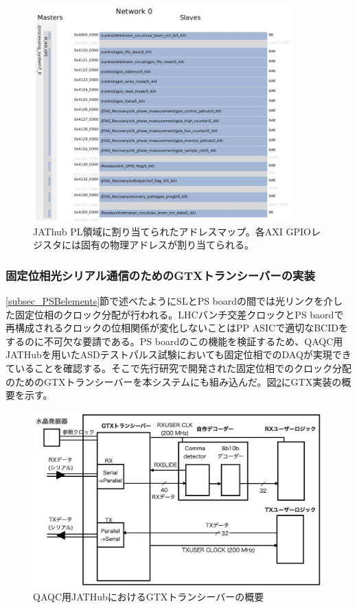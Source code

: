 \begin{figure} 
\centering
\includegraphics[width=10cm]{fig/JATHubaddress.png}
\caption[アドレスマップ]{JAThub PL領域に割り当てられたアドレスマップ。各AXI GPIOレジスタには固有の物理アドレスが割り当てられる。}
\label{JATHuaddress}
\end{figure}

\subsubsection{固定位相光シリアル通信のためのGTXトランシーバーの実装}
\label{subsubsec_gtx}
\ref{subsec_PSBelements}節で述べたようにSLとPS boardの間では光リンクを介した固定位相のクロック分配が行われる。LHCバンチ交差クロックとPS baordで再構成されるクロックの位相関係が変化しないことはPP ASICで適切なBCIDをするのに不可欠な要請である。PS boardのこの機能を検証するため、QAQC用JATHubを用いたASDテストパルス試験においても固定位相でのDAQが実現できていることを確認する。そこで先行研究で開発された固定位相でのクロック分配のためのGTXトランシーバーを本システムにも組み込んだ。図\ref{JATHubgtx}にGTX実装の概要を示す。
\baselineskip

\begin{figure} 
\centering
\includegraphics[width=16cm]{fig/JATHubgtx.png}
\caption[QAQC用JATHubにおけるGTXトランシーバーの概要]{QAQC用JATHubにおけるGTXトランシーバーの概要}
\label{JATHubgtx}
\end{figure}


